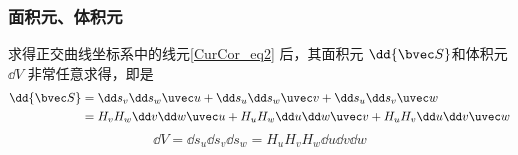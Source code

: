 \subsubsection{面积元、体积元}
求得正交曲线坐标系中的线元\autoref{CurCor_eq2} 后，其面积元 $\dd {\bvec S}$和体积元 $\dd V$ 非常任意求得，即是
\begin{equation}\label{CurCor_eq4}
\begin{aligned}
\dd {\bvec S}&=\dd s_v\dd s _w \uvec u+\dd s_u\dd s _w \uvec v+\dd s_u\dd s _v \uvec w\\
&=H_vH_w\dd v\dd w\uvec u+H_uH_w\dd u\dd w\uvec v+H_uH_v\dd u\dd v\uvec w
\end{aligned}
\end{equation}
\begin{equation}
\dd V=\dd s_u\dd s_v\dd s_w=H_uH_vH_w\dd u\dd v\dd w
\end{equation}


